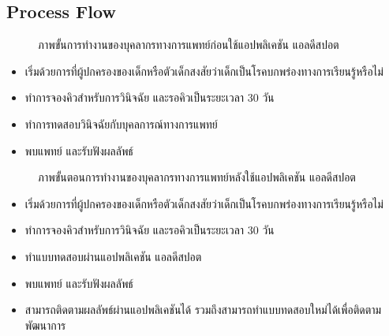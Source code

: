 \documentclass[12pt,oneside,openright,a4paper]{cpe-thai-project}
\begin{document}
\subsection{Process Flow}
\begin{figure}[!ht]\centering
  \setlength{\fboxrule}{0.2mm} %
  \setlength{\fboxsep}{1cm}
  \caption{ภาพขั้นการทำงานของบุคลากรทางการแพทย์ก่อนใช้แอปพลิเคชัน แอลดีสปอต}\label{fig:usecase}
\end{figure}
\begin{itemize}
  \item เริ่มด้วยการที่ผู้ปกครองของเด็กหรือตัวเด็กสงสัยว่าเด็กเป็นโรคบกพร่องทางการเรียนรู้หรือไม่ 
  \item ทำการจองคิวสำหรับการวินิจฉัย และรอคิวเป็นระยะเวลา 30 วัน
  \item ทำการทดสอบวินิจฉัยกับบุคลการณ์ทางการแพทย์ 
  \item พบแพทย์ และรับฟังผลลัพธ์
\end{itemize}
\begin{figure}[!ht]\centering
  \setlength{\fboxrule}{0.2mm} %
  \setlength{\fboxsep}{1cm}
  \caption{ภาพขั้นตอนการทำงานของบุคลากรทางการแพทย์หลังใช้แอปพลิเคชัน แอลดีสปอต}\label{fig:usecase}
\end{figure}
\begin{itemize}
  \item เริ่มด้วยการที่ผู้ปกครองของเด็กหรือตัวเด็กสงสัยว่าเด็กเป็นโรคบกพร่องทางการเรียนรู้หรือไม่ 
  \item ทำการจองคิวสำหรับการวินิจฉัย และรอคิวเป็นระยะเวลา 30 วัน
  \item ทำแบบทดสอบผ่านแอปพลิเคชัน แอลดีสปอต  
  \item พบแพทย์ และรับฟังผลลัพธ์
  \item สามารถติดตามผลลัพธ์ผ่านแอปพลิเคชันได้ รวมถึงสามารถทำแบบทดสอบใหม่ได้เพื่อติดตามพัฒนาการ
\end{itemize}
\newpage
\end{document}
